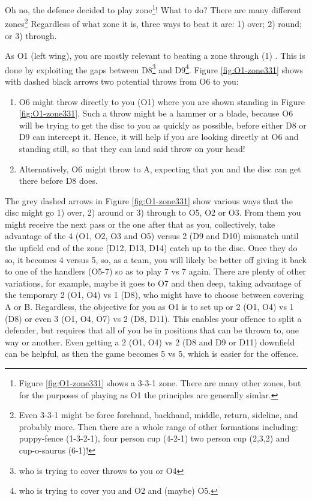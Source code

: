 \documentclass{tufte-handout}
\begin{document}
Oh no, 
the defence decided to play zone\footnote{
Figure \ref{fig:O1-zone331} shows a 3-3-1 zone.  
There are many other zones, 
but for the purposes of playing as O1
the principles are generally simlar.}! 
What to do? 
There are many different zones\footnote{
Even 3-3-1 might be force 
forehand, 
backhand,
middle, 
return,
sideline,
and probably more. 
Then there are 
a whole range of other formations
including:
puppy-fence (1-3-2-1),
four person cup (4-2-1)
two person cup (2,3,2) and
cup-o-saurus (6-1)!}
Regardless of what zone it is,
three ways to beat it are:
1) over;
2) round; or
3) through. 

As O1 
(left wing), 
you are mostly relevant to 
beating a zone through
(1)
.  
This is done by exploiting the gaps between 
D8\footnote{
who is trying to cover throws 
to you or O4} 
and D9\footnote{ 
who is trying to cover you 
and O2 and 
(maybe) O5.}.
Figure \ref{fig:O1-zone331} shows 
with dashed black arrows
two potential throws from O6 to you:
\begin{enumerate}
\item O6 might throw directly to you 
(O1) where you are shown 
standing in Figure \ref{fig:O1-zone331}. 
Such a throw might be a hammer
or a blade,
because O6 will be trying to get the disc to you 
as quickly as possible, 
before either D8 or D9 can intercept it. 
Hence, it will help if you are looking directly at O6 
and standing still, 
so that they can land said throw on your head!
\item Alternatively, O6 might throw to A, 
expecting that you and the disc can get there 
before D8 does.
\end{enumerate}

The grey dashed arrows in Figure \ref{fig:O1-zone331} 
show various ways that the disc might 
go 
1) over,
2) around or
3) through 
to O5, O2 or O3. 
From them you
might receive the next pass
or the one after that
as you, collectively, 
take advantage of the 
4 (O1, O2, O3 and O5) 
versus 2 (D9 and D10)
mismatch until the 
upfield end of the zone 
(D12, D13, D14) 
catch up to the disc. 
Once they do so, 
it becomes 4 versus 5, 
so, 
as a team,
 you will likely be 
better off giving it back to 
one of the handlers 
(O5-7) 
so as to play 
7 vs 7 again. 
There are plenty of other variations,
for example, maybe it 
goes 
to O7 and then deep,
taking advantage 
of the temporary 
2 (O1, O4) vs 1 (D8), 
who might have to choose 
between covering A
or B.  Regardless, 
the objective for you
as O1
is to set up 
or 2 (O1, O4) 
vs 1 (D8) 
or even 3 (O1, O4, O7) 
vs 2 (D8, D11). 
This enables your offence 
to split a defender, 
but requires that all of you
be in positions 
that can be thrown to, 
one way or another. 
Even getting a 
2 (O1, O4) 
vs 2 (D8 and D9 or D11)
downfield can be helpful, 
as then the game 
becomes 5 vs 5, 
which is easier for the offence. 
\end{document}
